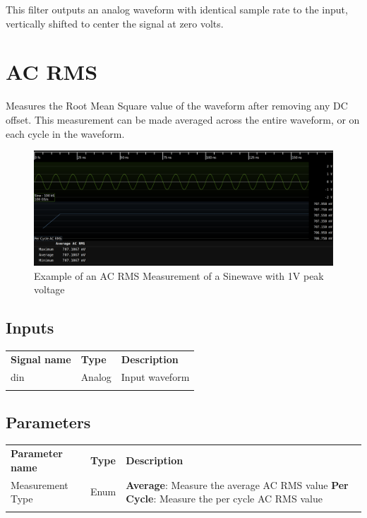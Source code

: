 This filter outputs an analog waveform with identical sample rate to the input, vertically shifted to center the signal
at zero volts.

\pagebreak
\section{AC RMS}
\label{filter:accouple}

Measures the Root Mean Square value of the waveform after removing any DC offset. This measurement can be made averaged
across the entire waveform, or on each cycle in the waveform.

\begin{figure}[h]
\centering
\includegraphics[width=16cm]{images/filters/ac-rms.png}
\caption{Example of an AC RMS Measurement of a Sinewave with 1V peak voltage}
\end{figure}

\subsection{Inputs}

\begin{tabularx}{16cm}{llX}
\thickhline
\textbf{Signal name} & \textbf{Type} & \textbf{Description} \\
\thickhline
din & Analog & Input waveform \\
\thickhline
\end{tabularx}

\subsection{Parameters}

\begin{tabularx}{16cm}{llX}
\thickhline
\textbf{Parameter name} & \textbf{Type} & \textbf{Description} \\
\thickhline
Measurement Type & Enum &
	\textbf{Average}: Measure the average AC RMS value\newline
	\textbf{Per Cycle}: Measure the per cycle AC RMS value\\
\thickhline
\end{tabularx}

